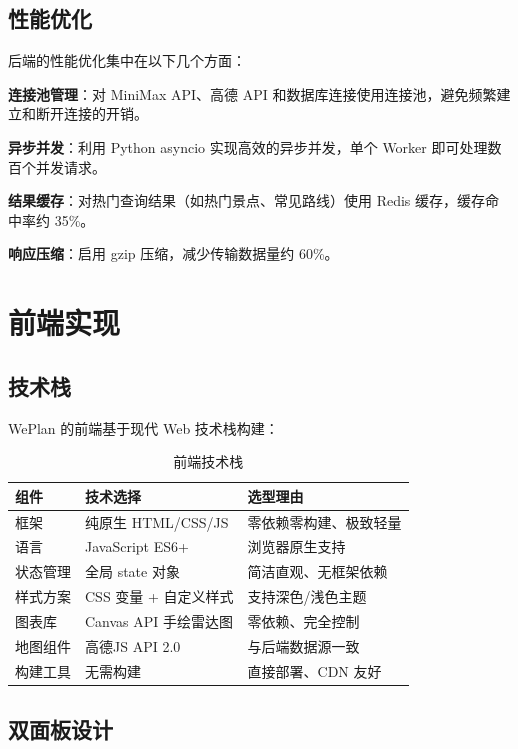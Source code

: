 \documentclass[12pt,a4paper]{ctexart}
\begin{document}
\subsection{性能优化}

后端的性能优化集中在以下几个方面：

\textbf{连接池管理}：对 MiniMax API、高德 API 和数据库连接使用连接池，避免频繁建立和断开连接的开销。

\textbf{异步并发}：利用 Python asyncio 实现高效的异步并发，单个 Worker 即可处理数百个并发请求。

\textbf{结果缓存}：对热门查询结果（如热门景点、常见路线）使用 Redis 缓存，缓存命中率约 35\%。

\textbf{响应压缩}：启用 gzip 压缩，减少传输数据量约 60\%。

\newpage

\section{前端实现}

\subsection{技术栈}

WePlan 的前端基于现代 Web 技术栈构建：

\begin{table}[H]
\centering
\caption{前端技术栈}
\label{tab:frontend-stack}
\renewcommand{\arraystretch}{1.3}
\begin{tabular}{p{3cm} p{3cm} p{6cm}}
\toprule
\textbf{组件} & \textbf{技术选择} & \textbf{选型理由} \\
\midrule
框架 & 纯原生 HTML/CSS/JS & 零依赖零构建、极致轻量 \\
语言 & JavaScript ES6+ & 浏览器原生支持 \\
状态管理 & 全局 state 对象 & 简洁直观、无框架依赖 \\
样式方案 & CSS 变量 + 自定义样式 & 支持深色/浅色主题 \\
图表库 & Canvas API 手绘雷达图 & 零依赖、完全控制 \\
地图组件 & 高德JS API 2.0 & 与后端数据源一致 \\
构建工具 & 无需构建 & 直接部署、CDN 友好 \\
\bottomrule
\end{tabular}
\end{table}

\subsection{双面板设计}
\end{document}
